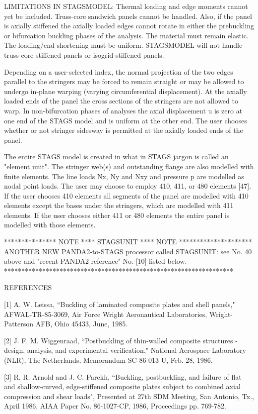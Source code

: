 LIMITATIONS IN STAGSMODEL: Thermal loading and edge moments cannot yet be
included. Truss-core sandwich panels cannot be handled. Also, if the panel
is axially stiffened the axially loaded edges cannot rotate in either the
prebuckling or bifurcation buckling phases of the analysis. The material
must remain elastic. The loading/end shortening must be uniform. 
STAGSMODEL will not handle truss-core stiffened panels or
isogrid-stiffened panels. 

Depending on a user-selected index, the normal projection of the two edges
parallel to the stringers may be forced to remain straight or may be
allowed to undergo in-plane warping (varying circumferential
displacement). At the axially loaded ends of the panel the cross sections
of the stringers are not allowed to warp. In non-bifurcation phases of
analyses the axial displacement u is zero at one end of the STAGS model
and is uniform at the other end. The user chooses whether or not stringer
sidesway is permitted at the axially loaded ends of the panel. 

The entire STAGS model is created in what in STAGS jargon is called an
"element unit".  The stringer web(s) and outstanding flange are also
modelled with finite elements. The line loads Nx, Ny and Nxy and pressure
p are modelled as nodal point loads.  The user may choose to employ 410,
411, or 480 elements [47]. If the user chooses 410 elements all segments
of the panel are modelled with 410 elements except the bases under the
stringers, which are modelled with 411 elements. If the user chooses
either 411 or 480 elements the entire panel is modelled with those
elements. 

 *************** NOTE **** STAGSUNIT **** NOTE *********************
ANOTHER NEW PANDA2-to-STAGS processor called STAGSUNIT: see No. 40
above and "recent PANDA2 reference" No. [10] listed below.
 ******************************************************************


                       REFERENCES

[1] A. W. Leissa, ``Buckling of laminated composite plates and shell
panels," AFWAL-TR-85-3069, Air Force Wright Aeronautical
Laboratories, Wright-Patterson AFB, Ohio 45433, June, 1985. 

[2] J. F. M. Wiggenraad, ``Postbuckling of thin-walled composite
structures - design, analysis, and experimental verification,"
National Aerospace Laboratory (NLR), The Netherlands, Memorandum
SC-86-013 U, Feb. 28, 1986. 

[3] R. R. Arnold and J. C. Parekh, ``Buckling, postbuckling, and
failure of flat and shallow-curved, edge-stiffened composite plates
subject to combined axial compression and shear loads", Presented at
27th SDM Meeting, San Antonio, Tx., April 1986, AIAA Paper No.
86-1027-CP, 1986, Proceedings pp. 769-782. 

